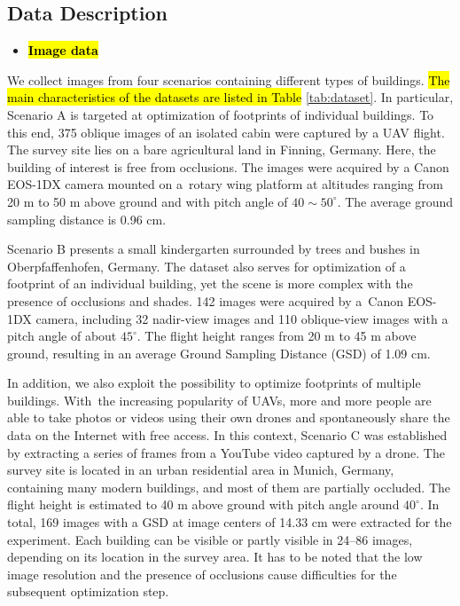 \documentclass[remotesensing,article,accept,moreauthors,pdftex,10pt,a4paper]{mdpi}
\theoremstyle{mdpi}
\newcounter{ex}
\newcounter{re}
\begin{document}
\subsection{Data Description}
\begin{itemize}[leftmargin=*,labelsep=5.5mm]
\item \textbf{\hl{Image data}}
\end{itemize}

We collect images from four scenarios containing different types of buildings. \hl{The main characteristics of the datasets are listed in Table }%
\ref{tab:dataset}. In particular, Scenario A is targeted at optimization of footprints of individual buildings. To this end, 375 oblique images of an isolated cabin were captured by a UAV flight. The survey site lies on a bare agricultural land in Finning, Germany. Here, the building of interest is free from occlusions. The images were acquired by a Canon EOS-1DX camera mounted on a~rotary wing platform at altitudes ranging from 20 m to 50 m above ground and with pitch angle of $40\sim50^\circ$. The average ground sampling distance is 0.96 cm.

Scenario B presents a small kindergarten surrounded by trees and bushes in Oberpfaffenhofen, Germany. The dataset also serves for optimization of a footprint of an individual building, yet the scene is more complex with the presence of occlusions and shades. 142 images were acquired by a~Canon EOS-1DX camera, including 32 nadir-view images and 110 oblique-view images with a pitch angle of about $45^\circ$. The flight height ranges from 20 m to 45 m above ground, resulting in an average Ground Sampling Distance (GSD) of 1.09 cm. 

In addition, we also exploit the possibility to optimize footprints of multiple buildings. With~the increasing popularity of UAVs, more and more people are able to take photos or videos using their own drones and spontaneously share the data on the Internet with free access. In this context, Scenario C was established by extracting a series of frames from a YouTube video captured by a drone. The survey site is located in an urban residential area in Munich, Germany, containing many modern buildings, and most of them are partially occluded. The flight height is estimated to 40 m above ground with pitch angle around $40^\circ$. In total, 169 images with a GSD at image centers of 14.33 cm were extracted for the experiment. Each building can be visible or partly visible in 24--86 images, depending on its location in the survey area. It has to be noted that the low image resolution and the presence of occlusions cause difficulties for the subsequent optimization step.
\end{document}
